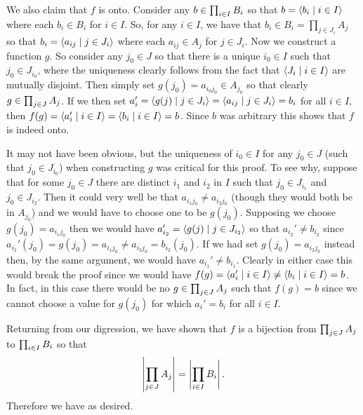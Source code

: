 {{    We also claim that $f$ is onto.
    Consider any $b \in \prodi B_i$ so that $b = \angles{b_i \where i \in I}$ where each $b_i \in B_i$ for $i \in I$.
    So, for any $i \in I$, we have that $b_i \in B_i = \prod_{j \in J_i} A_j$ so that $b_i = \angles{a_{ij} \where j \in J_i}$ where each $a_{ij} \in A_j$ for $j \in J_i$.
    Now we construct a function $g$.
    So consider any $j_0 \in J$ so that there is a unique $i_0 \in I$ such that $j_0 \in J_{i_0}$, where the uniqueness clearly follows from the fact that $\angles{J_i \where i \in I}$ are mutually disjoint.
    Then simply set $g(j_0) = a_{i_0 j_0} \in A_{j_0}$ so that clearly $g \in \prodj A_j$.
    If we then set $a_i' = \angles{g(j) \where j \in J_i} = \angles{a_{ij} \where j \in J_i} = b_i$ for all $i \in I$, then $f(g) = \angles{a_i' \where i \in I} = \angles{b_i \where i \in I} = b$.
    Since $b$ was arbitrary this shows that $f$ is indeed onto.

    It may not have been obvious, but the uniqueness of $i_0 \in I$ for any $j_0 \in J$ (such that $j_0 \in J_{i_0}$) when constructing $g$ was critical for this proof.
    To see why, suppose that for some $j_0 \in J$ there are distinct $i_1$ and $i_2$ in $I$ such that $j_0 \in J_{i_1}$ and $j_0 \in J_{i_2}$.
    Then it could very well be that $a_{i_1 j_0} \neq a_{i_2 j_0}$ (though they would both be in $A_{j_0}$) and we would have to choose one to be $g(j_0)$.
    Supposing we choose $g(j_0) = a_{i_1 j_0}$ then we would have $a_{i_2}' = \angles{g(j) \where j \in J_{i_2}}$ so that $a_{i_2}' \neq b_{i_2}$ since $a_{i_2}'(j_0) = g(j_0) = a_{i_1 j_0} \neq a_{i_2 j_0} = b_{i_2}(j_0)$.
    If we had set $g(j_0) = a_{i_2 j_0}$ instead then, by the same argument, we would have $a_{i_1}' \neq b_{i_1}$.
    Clearly in either case this would break the proof since we would have $f(g) = \angles{a_i' \where i \in I} \neq \angles{b_i \where i \in I} = b$.
    In fact, in this case there would be no $g \in \prodj A_j$ such that $f(g) = b$ since we cannot choose a value for $g(j_0)$ for which $a_i' = b_i$ for all $i \in I$.

    Returning from our digression, we have shown that $f$ is a bijection from $\prodj A_j$ to $\prodi B_i$ so that
    \begin{gather}
      \abs{\prodj A_j} = \abs{\prodi B_i}. \label{eqn:infsp:pJpI}
    \end{gather}
    Therefore we have
    as desired.
  }
}

